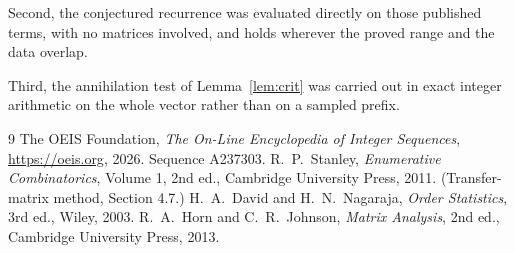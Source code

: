 \documentclass[11pt,a4paper]{article}
\theoremstyle{plain}
\theoremstyle{definition}
\begin{document}
Second, the conjectured recurrence was evaluated directly on those published terms, with no
matrices involved, and holds wherever the proved range and the data overlap.

Third, the annihilation test of Lemma~\ref{lem:crit} was carried out in exact integer
arithmetic on the whole vector rather than on a sampled prefix.

\begin{thebibliography}{9}
 The OEIS Foundation, \emph{The On-Line Encyclopedia of Integer
Sequences}, \url{https://oeis.org}, 2026. Sequence A237303.
 R.~P.~Stanley, \emph{Enumerative Combinatorics}, Volume 1, 2nd ed.,
Cambridge University Press, 2011. (Transfer-matrix method, Section 4.7.)
 H.~A.~David and H.~N.~Nagaraja, \emph{Order Statistics}, 3rd ed., Wiley,
2003.
 R.~A.~Horn and C.~R.~Johnson, \emph{Matrix Analysis}, 2nd ed., Cambridge
University Press, 2013.
\end{thebibliography}
\end{document}
